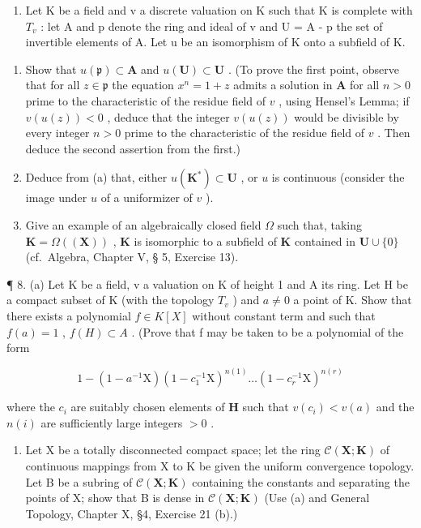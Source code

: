 \begin{enumerate}
\def\labelenumi{\arabic{enumi}.}
\setcounter{enumi}{6}
\tightlist
\item
  Let K be a field and v a discrete valuation on K such that K is complete with \(T_{v}\) : let A and p denote the ring and ideal of v and U = A - p the set of invertible elements of A. Let u be an isomorphism of K onto a subfield of K.
\end{enumerate}

\begin{enumerate}
\def\labelenumi{(\alph{enumi})}
\item
  Show that \(u(\mathfrak{p}) \subset \mathbf{A}\) and \(u(\mathbf{U}) \subset \mathbf{U}\) . (To prove the first point, observe that for all \(z \in \mathfrak{p}\) the equation \(x^n = 1 + z\) admits a solution in \(\mathbf{A}\) for all \(n > 0\) prime to the characteristic of the residue field of \(v\) , using Hensel's Lemma; if \(v(u(z)) < 0\) , deduce that the integer \(v(u(z))\) would be divisible by every integer \(n > 0\) prime to the characteristic of the residue field of \(v\) . Then deduce the second assertion from the first.)
\item
  Deduce from (a) that, either \(u(\mathbf{K}^*) \subset \mathbf{U}\) , or \(u\) is continuous (consider the image under \(u\) of a uniformizer of \(v\) ).
\item
  Give an example of an algebraically closed field \(\Omega\) such that, taking \(\mathbf{K} = \Omega((\mathbf{X}))\) , \(\mathbf{K}\) is isomorphic to a subfield of \(\mathbf{K}\) contained in \(\mathbf{U} \cup \{0\}\) (cf.~Algebra, Chapter V, § 5, Exercise 13).
\end{enumerate}

¶ 8. (a) Let K be a field, v a valuation on K of height 1 and A its ring. Let H be a compact subset of K (with the topology \(T_{v}\) ) and \(a \neq 0\) a point of K. Show that there exists a polynomial \(f \in K[X]\) without constant term and such that \(f(a) = 1\) , \(f(H) \subset A\) . (Prove that f may be taken to be a polynomial of the form

\[
1 - (1 - a ^ {- 1} \mathrm{X}) (1 - c _ {1} ^ {- 1} \mathrm{X}) ^ {n (1)} \dots (1 - c _ {r} ^ {- 1} \mathrm{X}) ^ {n (r)}
\]

where the \(c_{i}\) are suitably chosen elements of \(\mathbf{H}\) such that \(v(c_{i}) < v(a)\) and the \(n(i)\) are sufficiently large integers \(>0\) .

\begin{enumerate}
\def\labelenumi{(\alph{enumi})}
\setcounter{enumi}{1}
\tightlist
\item
  Let X be a totally disconnected compact space; let the ring \(\mathcal{C}(\mathbf{X};\mathbf{K})\) of continuous mappings from X to K be given the uniform convergence topology. Let B be a subring of \(\mathcal{C}(\mathbf{X};\mathbf{K})\) containing the constants and separating the points of X; show that B is dense in \(\mathcal{C}(\mathbf{X};\mathbf{K})\) (Use (a) and General Topology, Chapter X, §4, Exercise 21 (b).)
\end{enumerate}

